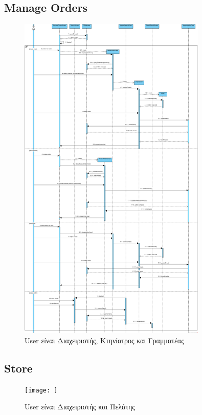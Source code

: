 \documentclass[12pt,a4paper,twoside]{book}
\begin{document}
\subsection{Manage Orders}
\begin{figure}[H]
    \centering
    \includegraphics[width=0.8\textwidth]{Resources/Sequence Diagram/manage_orders_sd.png}
    \caption{User είναι Διαχειριστής, Κτηνίατρος και Γραμματέας}\label{fig:sequence-manage-orders}
\end{figure}

\subsection{Store}
\begin{figure}[H]
    \centering
    \texttt{[image: ]}
    \caption{User είναι Διαχειριστής και Πελάτης}\label{fig:sequence-store}
\end{figure}
\end{document}

